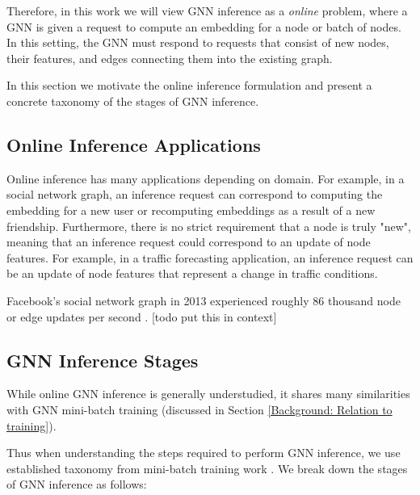 Therefore, in this work we will view GNN inference as a \textit{online} problem, where a GNN is given a request to compute an embedding for a node or batch of nodes. In this setting, the GNN must respond to requests that consist of new nodes, their features, and edges connecting them into the existing graph.

In this section we motivate the online inference formulation and present a concrete taxonomy of the stages of GNN inference.

\subsection{Online Inference Applications}
Online inference has many applications depending on domain.
For example, in a social network graph, an inference request can correspond to computing the embedding for a new user or recomputing embeddings as a result of a new friendship. 
Furthermore, there is no strict requirement that a node is truly "new", meaning that an inference request could correspond to an update of node features.
For example, in a traffic forecasting application, an inference request can be an update of node features that represent a change in traffic conditions.

Facebook's social network graph in 2013 experienced roughly 86 thousand node or edge updates per second \cite{Graph_Survey_2020}. [todo put this in context]

\subsection{GNN Inference Stages}
While online GNN inference is generally understudied, it shares many similarities with GNN mini-batch training (discussed in Section \ref{Background: Relation to training}).

Thus when understanding the steps required to perform GNN inference, we use established taxonomy from mini-batch training work \cite{PaGraph_2020}\cite{GNNLab_2022}\cite{P3_2021}. We break down the stages of GNN inference as follows:

